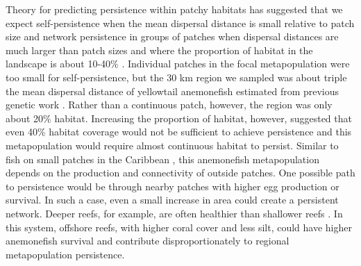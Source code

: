 \documentclass[12pt, oneside]{article}   	%
\begin{document}
Theory for predicting persistence within patchy habitats has suggested that we expect self-persistence when the mean dispersal distance is small relative to patch size and network persistence in groups of patches when dispersal distances are much larger than patch sizes and where the proportion of habitat in the landscape is about 10-40\% \citep[depending on the particular species, population, and maximum reproductive rate,][]{botsford2019population}. Individual patches in the focal metapopulation were too small for self-persistence, but the 30 km region we sampled was about triple the mean dispersal distance of yellowtail anemonefish estimated from previous genetic work \citep[8-9 km,][]{pinsky2010using, catalanoInPrepconnectivity}. Rather than a continuous patch, however, the region was only about 20\% habitat. Increasing the proportion of habitat, however, suggested that even 40\% habitat coverage would not be sufficient to achieve persistence and this metapopulation would require almost continuous habitat to persist. Similar to fish on small patches in the Caribbean \citep{johnson2018integrating}, this anemonefish metapopulation depends on the production and connectivity of outside patches. One possible path to persistence would be through nearby patches with higher egg production or survival. In such a case, even a small increase in area could create a persistent network. Deeper reefs, for example, are often healthier than shallower reefs \citep{cinner2016bright}. In this system, offshore reefs, with higher coral cover and less silt, could have higher anemonefish survival and contribute disproportionately to regional metapopulation persistence. %

\end{document}
